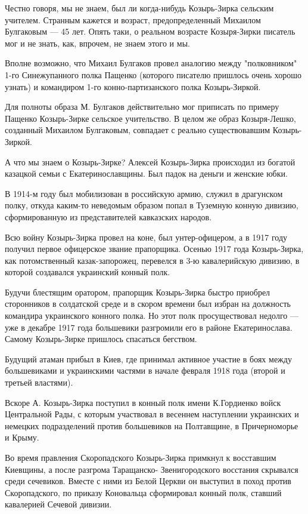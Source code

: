 Честно говоря, мы не знаем, был ли когда-нибудь Козырь-Зирка сельским учителем.
Странным кажется и возраст, предопределенный Михаилом Булгаковым — 45 лет.
Опять таки, о реальном возрасте Козыря-Зирки писатель мог и не знать, как,
впрочем, не знаем этого и мы. 

Вполне возможно, что Михаил Булгаков провел аналогию между "полковником"
1-го Синежупанного полка Пащенко (которого писателю пришлось очень хорошо
узнать) и командиром 1-го конно-партизанского полка Козырь-Зиркой. 

Для полноты образа М. Булгаков действительно мог приписать по примеру
Пащенко Козырь-Зирке сельское учительство. В целом же образ Козыря-Лешко,
созданный Михаилом Булгаковым, совпадает с реально существовавшим
Козырь-Зиркой.

А что мы знаем о Козырь-Зирке? Алексей Козырь-Зирка происходил из богатой
казацкой семьи с Екатеринославщины. Был падок на деньги и женские юбки. 

В 1914-м году был мобилизован в российскую армию, служил в драгунском полку,
откуда каким-то неведомым образом попал в Туземную конную дивизию,
сформированную из представителей кавказских народов. 

Всю войну Козырь-Зирка провел на коне, был унтер-офицером, а в 1917 году
получил первое офицерское звание прапорщика. Осенью 1917 года Козырь-Зирка,
как потомственный казак-запорожец, перевелся в 3-ю кавалерийскую дивизию, в
которой создавался украинский конный полк. 

Будучи блестящим оратором, прапорщик Козырь-Зирка быстро приобрел
сторонников в солдатской среде и в скором времени был избран на должность
командира украинского конного полка. Но этот полк просуществовал недолго —
уже в декабре 1917 года большевики разгромили его в районе Екатеринослава.
Самому Козырь-Зирке пришлось спасаться бегством. 

Будущий атаман прибыл в Киев, где принимал активное участие в боях между
большевиками и украинскими частями в начале февраля 1918 года (второй и
третьей властями). 

Вскоре А. Козырь-Зирка поступил в конный полк имени К.Гордиенко войск
Центральной Рады, с которым участвовал в весеннем наступлении украинских и
немецких подразделений против большевиков на Полтавщине, в Причерноморье и
Крыму. 

Во время правления Скоропадского Козырь-Зирка примкнул к восставшим
Киевщины, а после разгрома Таращанско- Звенигородского восстания скрывался
среди сечевиков. Вместе с ними из Белой Церкви он выступил в поход против
Скоропадского, по приказу Коновальца сформировал конный полк, ставший
кавалерией Сечевой дивизии. 

